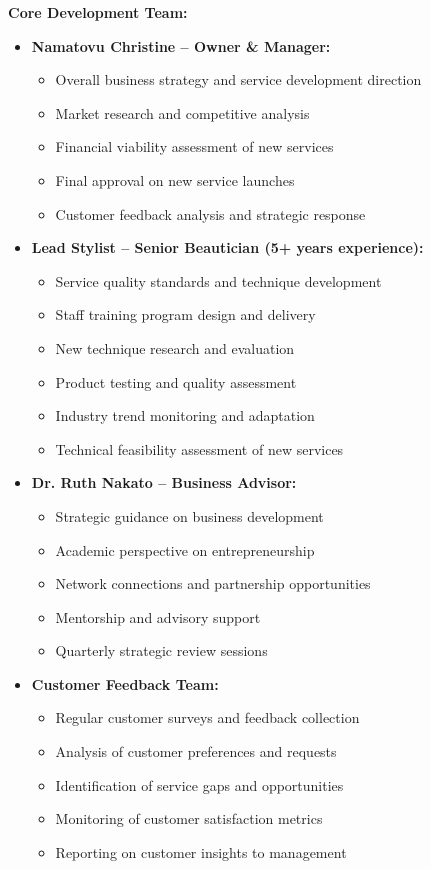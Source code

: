 \textbf{Core Development Team:}
\begin{itemize}[leftmargin=2em]
    \item \textbf{Namatovu Christine -- Owner \& Manager:}
    \begin{itemize}
        \item Overall business strategy and service development direction
        \item Market research and competitive analysis
        \item Financial viability assessment of new services
        \item Final approval on new service launches
        \item Customer feedback analysis and strategic response
    \end{itemize}
    
    \item \textbf{Lead Stylist -- Senior Beautician (5+ years experience):}
    \begin{itemize}
        \item Service quality standards and technique development
        \item Staff training program design and delivery
        \item New technique research and evaluation
        \item Product testing and quality assessment
        \item Industry trend monitoring and adaptation
        \item Technical feasibility assessment of new services
    \end{itemize}
    
    \item \textbf{Dr. Ruth Nakato -- Business Advisor:}
    \begin{itemize}
        \item Strategic guidance on business development
        \item Academic perspective on entrepreneurship
        \item Network connections and partnership opportunities
        \item Mentorship and advisory support
        \item Quarterly strategic review sessions
    \end{itemize}
    
    \item \textbf{Customer Feedback Team:}
    \begin{itemize}
        \item Regular customer surveys and feedback collection
        \item Analysis of customer preferences and requests
        \item Identification of service gaps and opportunities
        \item Monitoring of customer satisfaction metrics
        \item Reporting on customer insights to management
    \end{itemize}
    

\end{itemize}
